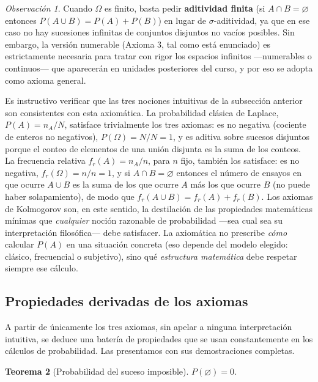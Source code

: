 \documentclass[11pt,a4paper]{article}
\theoremstyle{plain}
\newtheorem{teorema}{Teorema}[section]
\theoremstyle{definition}
\theoremstyle{remark}
\newtheorem{observacion}[teorema]{Observación}
\begin{document}
\begin{observacion}
Cuando $\Omega$ es finito, basta pedir \textbf{aditividad finita} (si $A\cap B=\varnothing$ entonces $P(A\cup B)=P(A)+P(B)$) en lugar de $\sigma$-aditividad, ya que en ese caso no hay sucesiones infinitas de conjuntos disjuntos no vacíos posibles. Sin embargo, la versión numerable (Axioma 3, tal como está enunciado) es estrictamente necesaria para tratar con rigor los espacios infinitos —numerables o continuos— que aparecerán en unidades posteriores del curso, y por eso se adopta como axioma general.
\end{observacion}

Es instructivo verificar que las tres nociones intuitivas de la subsección anterior son consistentes con esta axiomática. La probabilidad clásica de Laplace, $P(A)=n_A/N$, satisface trivialmente los tres axiomas: es no negativa (cociente de enteros no negativos), $P(\Omega)=N/N=1$, y es aditiva sobre sucesos disjuntos porque el conteo de elementos de una unión disjunta es la suma de los conteos. La frecuencia relativa $f_r(A)=n_A/n$, para $n$ fijo, también los satisface: es no negativa, $f_r(\Omega)=n/n=1$, y si $A\cap B=\varnothing$ entonces el número de ensayos en que ocurre $A\cup B$ es la suma de los que ocurre $A$ más los que ocurre $B$ (no puede haber solapamiento), de modo que $f_r(A\cup B)=f_r(A)+f_r(B)$. Los axiomas de Kolmogorov son, en este sentido, la destilación de las propiedades matemáticas mínimas que \emph{cualquier} noción razonable de probabilidad —sea cual sea su interpretación filosófica— debe satisfacer. La axiomática no prescribe \emph{cómo} calcular $P(A)$ en una situación concreta (eso depende del modelo elegido: clásico, frecuencial o subjetivo), sino qué \emph{estructura matemática} debe respetar siempre ese cálculo.

\subsection{Propiedades derivadas de los axiomas}

A partir de únicamente los tres axiomas, sin apelar a ninguna interpretación intuitiva, se deduce una batería de propiedades que se usan constantemente en los cálculos de probabilidad. Las presentamos con sus demostraciones completas.

\begin{teorema}[Probabilidad del suceso imposible]
$P(\varnothing) = 0$.
\end{teorema}
\end{document}
